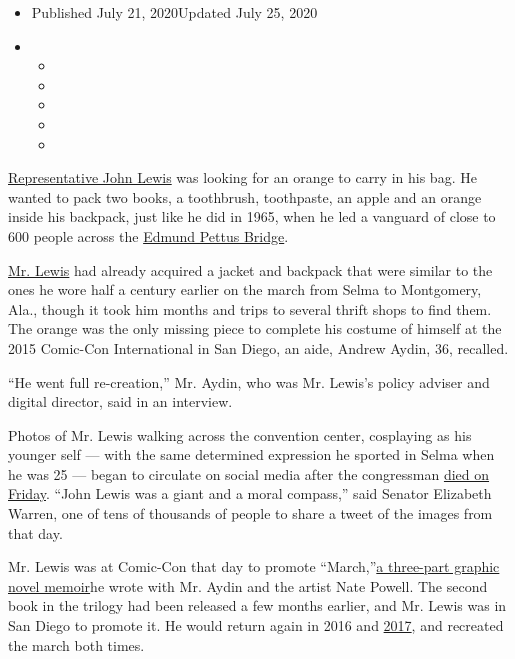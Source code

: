 \begin{itemize}
\item
  Published July 21, 2020Updated July 25, 2020
\item
  \begin{itemize}
  \item
  \item
  \item
  \item
  \item
  \end{itemize}
\end{itemize}

\href{https://www.nytimes.com/2020/07/25/us/john-lewis-memorial-service.html}{Representative
John Lewis} was looking for an orange to carry in his bag. He wanted to
pack two books, a toothbrush, toothpaste, an apple and an orange inside
his backpack, just like he did in 1965, when he led a vanguard of close
to 600 people across the
\href{http://www.nytimes.com/2020/07/18/us/politics/edmund-pettus-bridge-renamed-john-lewis.html}{Edmund
Pettus Bridge}.

\href{https://www.nytimes.com/2020/07/25/us/photos-john-lewis-memorial.html}{Mr.
Lewis} had already acquired a jacket and backpack that were similar to
the ones he wore half a century earlier on the march from Selma to
Montgomery, Ala., though it took him months and trips to several thrift
shops to find them. The orange was the only missing piece to complete
his costume of himself at the 2015 Comic-Con International in San Diego,
an aide, Andrew Aydin, 36, recalled.

``He went full re-creation,'' Mr. Aydin, who was Mr. Lewis's policy
adviser and digital director, said in an interview.

Photos of Mr. Lewis walking across the convention center, cosplaying as
his younger self --- with the same determined expression he sported in
Selma when he was 25 --- began to circulate on social media after the
congressman
\href{https://www.nytimes.com/2020/07/17/us/john-lewis-dead.html}{died
on Friday}. ``John Lewis was a giant and a moral compass,'' said Senator
Elizabeth Warren, one of tens of thousands of people to share a tweet of
the images from that day.

Mr. Lewis was at Comic-Con that day to promote
``March,''\href{https://www.nytimes.com/2016/11/27/books/review/john-lewis-march.html}{a
three-part graphic novel memoir}he wrote with Mr. Aydin and the artist
Nate Powell. The second book in the trilogy had been released a few
months earlier, and Mr. Lewis was in San Diego to promote it. He would
return again in 2016 and
\href{https://apnews.com/053a3111dd354e1c8522cdc03bc4b755/Civil-rights-icon-leads-march-through-California-Comic-Con}{2017},
and recreated the march both times.

